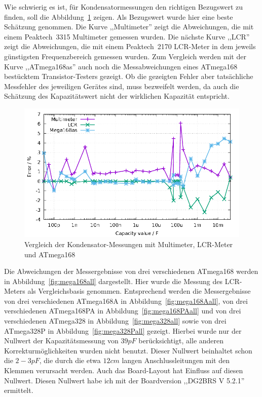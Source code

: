 Wie schwierig es ist, für Kondensatormessungen den richtigen Bezugswert zu finden, soll die Abbildung~\ref{fig:capcompare} zeigen.
Als Bezugswert wurde hier eine beste Schätzung genommen. Die Kurve ,,Multimeter'' zeigt die Abweichungen, die mit einem
Peaktech~3315 Multimeter gemessen wurden.
Die nächste Kurve ,,LCR'' zeigt die Abweichungen, die mit einem Peaktech~2170 LCR-Meter in dem jeweils günstigsten Frequenzbereich gemessen wurden.
Zum Vergleich werden mit der Kurve ,,ATmega168as'' auch noch die Messabweichungen eines ATmega168 bestücktem Transistor-Testers gezeigt.
Ob die gezeigten Fehler aber tatsächliche Messfehler des jeweiligen Gerätes sind, muss bezweifelt werden, da auch die
Schätzung des Kapazitätswert nicht der wirklichen Kapazität entspricht.

\begin{figure}[H]
\centering
\includegraphics[width=18cm]{../GNU/capcompare.pdf}
\caption{Vergleich der Kondensator-Messungen mit Multimeter, LCR-Meter und ATmega168}
\label{fig:capcompare}
\end{figure}

Die Abweichungen der Messergebnisse von drei verschiedenen ATmega168 werden in Abbildung~\ref{fig:mega168all} dargestellt.
Hier wurde die Messung des LCR-Meters als Vergleichsbasis genommen.
Entsprechend werden die Messergebnisse von drei verschiedenen ATmega168A in Abbildung~\ref{fig:mega168Aall}, 
von drei verschiedenen ATmega168PA in Abbildung~\ref{fig:mega168PAall} und von drei verschiedenen
ATmega328 in Abbildung~\ref{fig:mega328all} sowie von drei ATmega328P in Abbildung~\ref{fig:mega328Pall} gezeigt.
Hierbei wurde nur der Nullwert der Kapazitätsmessung von \(39pF\) berücksichtigt, alle anderen Korrekturmöglichkeiten wurden
nicht benutzt. Dieser Nullwert beinhaltet schon die \(2-3pF\), die durch die etwa \(12cm\) langen Anschlussleitungen mit den
Klemmen verursacht werden.
Auch das Board-Layout hat Einfluss auf diesen Nullwert. Diesen Nullwert habe ich mit der Boardversion ,,DG2BRS V 5.2.1'' ermittelt.

